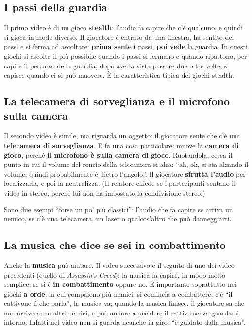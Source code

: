 \subsection{I passi della guardia}

Il primo video è di un gioco \textbf{stealth}: l'audio fa capire che c'è
qualcuno, e quindi si gioca in modo diverso. Il giocatore è entrato da una
finestra, ha sentito dei passi e si ferma ad ascoltare: \textbf{prima sente} i
passi, \textbf{poi vede} la guardia. In questi giochi si ascolta il più possibile
quando i passi si fermano e quando ripartono, per capire il percorso della
guardia; dopo averla vista passare due o tre volte, si capisce quando ci si può
muovere. È la caratteristica tipica dei giochi stealth.

\subsection{La telecamera di sorveglianza e il microfono sulla camera}

Il secondo video è simile, ma riguarda un oggetto: il giocatore sente che c'è una
\textbf{telecamera di sorveglianza}. E fa una cosa particolare: muove la
\textbf{camera di gioco}, perché \textbf{il microfono è sulla camera di gioco}.
Ruotandola, cerca il punto in cui il volume del ronzio della telecamera si alza:
``ah, ok, si sta alzando il volume, quindi probabilmente è dietro l'angolo''. Il
giocatore \textbf{sfrutta l'audio} per localizzarla, e poi la neutralizza. (Il
relatore chiede se i partecipanti sentano il video in stereo, perché lui non ha
impostato la condivisione stereo.)

Sono due esempi ``forse un po' più classici'': l'audio che fa capire se arriva un
nemico, se c'è una telecamera, un laser o qualcos'altro che può danneggiarti.

\subsection{La musica che dice se sei in combattimento}

Anche la \textbf{musica} può aiutare. Il video successivo è il seguito di uno dei
video precedenti (quello di \emph{Assassin's Creed}): la musica fa capire, in
modo molto semplice, se si è \textbf{in combattimento} oppure no. È importante
soprattutto nei giochi \textbf{a orde}, in cui compaiono più nemici: si comincia a
combattere, c'è ``il cattivone lì che parla'', la musica va; quando la musica
finisce, il giocatore sa che non arriveranno altri nemici, e può andare a
uccidere il cattivo senza guardarsi intorno. Infatti nel video non si guarda
neanche in giro: ``è guidato dalla musica''.

